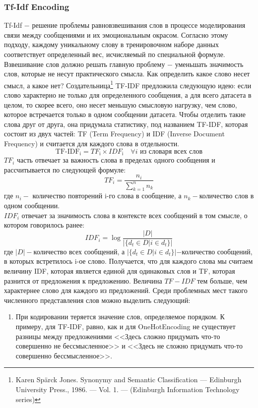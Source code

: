 \documentclass{article}
\begin{document}
\subsubsection{Tf-Idf Encoding}
Tf-Idf $-$ решение проблемы равновзвешивания слов в процессе моделирования связи между сообщениями и их эмоциональным окрасом. Согласно этому подходу, каждому уникальному слову в тренировочном наборе данных соответствует определенный вес, исчисляемый по специальной формуле. Взвешивание слов должно решать главную проблему $-$ уменьшать значимость слов, которые не несут практического смысла. Как определить какое слово несет смысл, а какое нет? Создательница\footnote{Karen Spärck Jones. Synonymy and Semantic Classification — Edinburgh University Press., 1986. — Vol. 1. — (Edinburgh Information Technology series)} TF-IDF предложила следующую идею: если слово характерно не только для определенного сообщения, а для всего датасета в целом, то скорее всего, оно несет меньшую смысловую нагрузку, чем слово, которое встречается только в одном сообщении датасета. Чтобы отделить такие слова друг от друга, она придумала статистику, под названием TF-IDF, которая состоит из двух частей: TF (Term Frequency) и IDF (Inverse Document Frequency) и считается для каждого слова в отдельности. \[\text{TF-IDF}_{\text{i}} = TF_{\text{i}} \times IDF_{\text{i}} \quad \forall i  \text{ из словаря всех слов}\]
$TF_{i}$ часть отвечает за важность слова в пределах одного сообщения и рассчитывается по следующей формуле: \[ TF_{i} = \frac{n_{i}}{\sum\limits_{k=1}^{n}n_k} \]
где $n_i -$ количество повторений i-го слова в сообщение, а $n_k - $количество слов в одном сообщении.\\
$IDF_i$ отвечает за значимость слова в контексте всех сообщений в том смысле, о котором говорилось ранее: \[ IDF_i = \log \frac{|D|}{|{\{d_t \in D | i \in d_t\}}|}\] 
где $|D| - $количество всех сообщений, а $|\{d_t \in D | i \in d_t\}| - $количество сообщений, в которых встретилось i-ое слово. 
Получается, что для каждого слова мы считаем величину IDF, которая является единой для одинаковых слов и TF, которая разнится от предложения к предложению. Величина $TF-IDF$ тем больше, чем характернее слово для каждого из предложений. Среди проблемных мест такого численного представления слов можно выделить следующий:

\begin{enumerate}
	\item При кодировании теряется значение слов, определяемое порядком. К примеру, для TF-IDF, равно, как и для OneHotEncoding не существует разницы между предложениями <<Здесь сложно придумать что-то совершенно не бессмысленное>> и  <<Здесь не сложно придумать что-то совершенно бессмысленное>>.
\end{enumerate}
\end{document}
